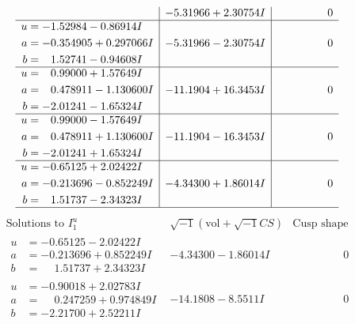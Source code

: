 \documentclass[1p]{elsarticle_modified}
\theoremstyle{definition}
\newcommand{\I}{\sqrt{-1}}
\begin{document}
$$\begin{array}{c|c|c}
 & -5.31966 + 2.30754 I & \phantom{-0.000000 } 0 \\ \hline\begin{aligned}
u &= -1.52984 - 0.86914 I \\
a &= -0.354905 + 0.297066 I \\
b &= \phantom{-}1.52741 - 0.94608 I\end{aligned}
 & -5.31966 - 2.30754 I & \phantom{-0.000000 } 0 \\ \hline\begin{aligned}
u &= \phantom{-}0.99000 + 1.57649 I \\
a &= \phantom{-}0.478911 - 1.130600 I \\
b &= -2.01241 - 1.65324 I\end{aligned}
 & -11.1904 + 16.3453 I & \phantom{-0.000000 } 0 \\ \hline\begin{aligned}
u &= \phantom{-}0.99000 - 1.57649 I \\
a &= \phantom{-}0.478911 + 1.130600 I \\
b &= -2.01241 + 1.65324 I\end{aligned}
 & -11.1904 - 16.3453 I & \phantom{-0.000000 } 0 \\ \hline\begin{aligned}
u &= -0.65125 + 2.02422 I \\
a &= -0.213696 - 0.852249 I \\
b &= \phantom{-}1.51737 - 2.34323 I\end{aligned}
 & -4.34300 + 1.86014 I & \phantom{-0.000000 } 0\\
 \hline 
 \end{array}$$\newpage$$\begin{array}{c|c|c}  
\text{Solutions to }I^u_{1}& \I (\text{vol} + \sqrt{-1}CS) & \text{Cusp shape}\\
 \hline 
\begin{aligned}
u &= -0.65125 - 2.02422 I \\
a &= -0.213696 + 0.852249 I \\
b &= \phantom{-}1.51737 + 2.34323 I\end{aligned}
 & -4.34300 - 1.86014 I & \phantom{-0.000000 } 0 \\ \hline\begin{aligned}
u &= -0.90018 + 2.02783 I \\
a &= \phantom{-}0.247259 + 0.974849 I \\
b &= -2.21700 + 2.52211 I\end{aligned}
 & -14.1808 - 8.5511 I & \phantom{-0.000000 } 0 \\ \hline\begin{aligned}

\end{aligned}
\end{array}$$
\end{document}
